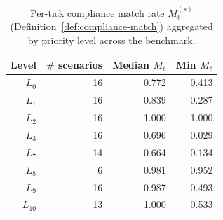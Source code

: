 \begin{table}[t]
    \centering
    \caption{Per-tick compliance match rate $M_\ell^{(s)}$ (Definition~\ref{def:compliance-match}) aggregated by priority level across the benchmark.}
    \label{tab:compliance}
    \footnotesize
\begin{tabular}{rrrr}
\toprule
Level & $\#$ scenarios & Median $M_\ell$ & Min $M_\ell$ \\
\midrule
$L_{0}$ & 16 & 0.772 & 0.413 \\
$L_{1}$ & 16 & 0.839 & 0.287 \\
$L_{2}$ & 16 & 1.000 & 1.000 \\
$L_{3}$ & 16 & 0.696 & 0.029 \\
$L_{7}$ & 14 & 0.664 & 0.134 \\
$L_{8}$ & 6 & 0.981 & 0.952 \\
$L_{9}$ & 16 & 0.987 & 0.493 \\
$L_{10}$ & 13 & 1.000 & 0.533 \\
\bottomrule
\end{tabular}
\end{table}
